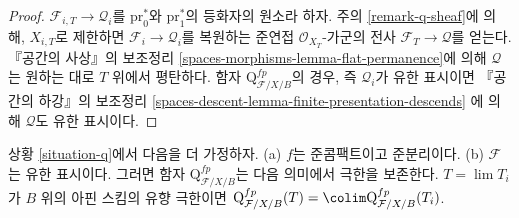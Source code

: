 \begin{proof}
$\mathcal{F}_{i, T} \to \mathcal{Q}_i$를 $\text{pr}_0^*$와
$\text{pr}_1^*$의 등화자의 원소라 하자. 주의 \ref{remark-q-sheaf}에 의해,
$X_{i, T}$로 제한하면 $\mathcal{F}_i \to \mathcal{Q}_i$를 복원하는
준연접 $\mathcal{O}_{X_T}$-가군의 전사
$\mathcal{F}_T \to \mathcal{Q}$를 얻는다. 『공간의 사상』의 보조정리
\ref{spaces-morphisms-lemma-flat-permanence}에 의해 $\mathcal{Q}$는 원하는 대로
$T$ 위에서 평탄하다. 함자 $\text{Q}^{fp}_{\mathcal{F}/X/B}$의 경우,
즉 $\mathcal{Q}_i$가 유한 표시이면 『공간의 하강』의 보조정리
\ref{spaces-descent-lemma-finite-presentation-descends}
에 의해 $\mathcal{Q}$도 유한 표시이다.
\end{proof}

\begin{lemma}
\label{lemma-q-limit-preserving}
상황 \ref{situation-q}에서 다음을 더 가정하자.
(a) $f$는 준콤팩트이고 준분리이다.
(b) $\mathcal{F}$는 유한 표시이다.
그러면 함자 $\text{Q}^{fp}_{\mathcal{F}/X/B}$는 다음 의미에서
극한을 보존한다. $T = \lim T_i$가 $B$ 위의 아핀 스킴의 유향 극한이면
$\text{Q}^{fp}_{\mathcal{F}/X/B}(T) =
\colim \text{Q}^{fp}_{\mathcal{F}/X/B}(T_i)$.
\end{lemma}

